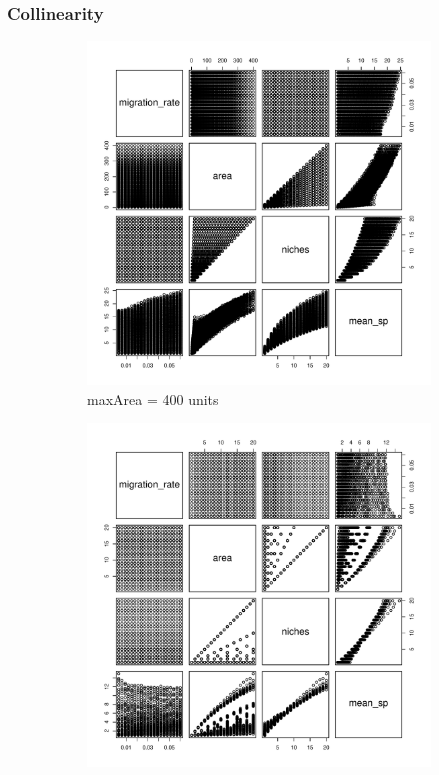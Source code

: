 \documentclass{article}
\begin{document}
\subsubsection{Collinearity}

\begin{figure}[!h]
  \centering
  \begin{subfigure}[b]{0.4\linewidth}
    \includegraphics[width=\linewidth]{../../Results/Simulation/CollinearityPlot_1.pdf}
    \caption{maxArea = 400 units}
  \end{subfigure}
  \begin{subfigure}[b]{0.4\linewidth}
    \includegraphics[width=\linewidth]{../../Results/Simulation/CollinearityPlot_20.pdf}

\end{subfigure}
\end{figure}
\end{document}
